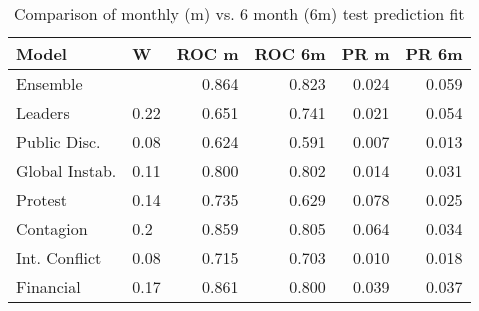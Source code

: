 \begin{table}[ht]
\centering
\begin{tabular}{llrrrr}
  \toprule
Model & W & ROC m & ROC 6m & PR m & PR 6m \\ 
  \midrule
Ensemble &  & 0.864 & 0.823 & 0.024 & 0.059 \\ 
  Leaders & 0.22 & 0.651 & 0.741 & 0.021 & 0.054 \\ 
  Public Disc. & 0.08 & 0.624 & 0.591 & 0.007 & 0.013 \\ 
  Global Instab. & 0.11 & 0.800 & 0.802 & 0.014 & 0.031 \\ 
  Protest & 0.14 & 0.735 & 0.629 & 0.078 & 0.025 \\ 
  Contagion & 0.2 & 0.859 & 0.805 & 0.064 & 0.034 \\ 
  Int. Conflict & 0.08 & 0.715 & 0.703 & 0.010 & 0.018 \\ 
  Financial & 0.17 & 0.861 & 0.800 & 0.039 & 0.037 \\ 
   \bottomrule
\end{tabular}
\caption{Comparison of monthly (m) vs. 6 month (6m) test prediction fit} 
\label{tab:test6}
\end{table}

